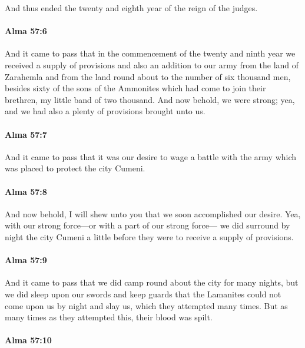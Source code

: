 			And thus ended the twenty and eighth year of the reign of the judges.

		\paragraph{Alma 57:6} %
			\label{ALMA-57-6}

			And it came to pass that in the commencement of the twenty and ninth year
			we received a supply of provisions
			and also an addition to our army
			from the land of Zarahemla and from the land round about
			to the number of six thousand men,
			besides sixty of the sons of the Ammonites
			which had come to join their brethren, my little band of two thousand.
			And now behold, we were strong;
			yea, and we had also a plenty of provisions brought unto us.

		\paragraph{Alma 57:7} %
			\label{ALMA-57-7}

			And it came to pass that it was our desire to wage a battle
			with the army which was placed to protect the city Cumeni.

		\paragraph{Alma 57:8} %
			\label{ALMA-57-8}

			And now behold, I will shew unto you that we soon accomplished our desire.
			Yea, with our strong force---or with a part of our strong force---
			we did surround by night the city Cumeni
			a little before they were to receive a supply of provisions.

		\paragraph{Alma 57:9} %
			\label{ALMA-57-9}

			And it came to pass that we did camp round about the city for many nights,
			but we did sleep upon our swords and keep guards
			that the Lamanites could not come upon us by night and slay us,
			which they attempted many times.
			But as many times as they attempted this, their blood was spilt.

		\paragraph{Alma 57:10} %
			\label{ALMA-57-10}


